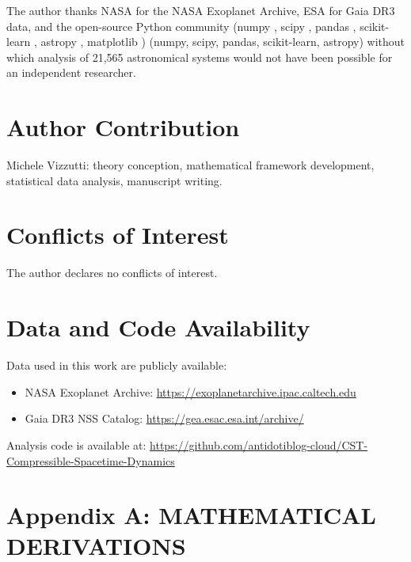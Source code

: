 \documentclass[11pt,a4paper]{article}
\begin{document}
The author thanks NASA for the NASA Exoplanet Archive, ESA for Gaia DR3
data, and the open-source Python community (numpy \cite{ScipyDevelopers2020}, scipy \cite{ScipyDevelopers2020}, pandas \cite{ref72}, scikit-learn \cite{Pedregosa2011}, astropy \cite{AstropyCollaboration2013,AstropyCollaboration2018}, matplotlib \cite{Hunter2007}) (numpy, scipy, pandas,
scikit-learn, astropy) without which analysis of 21,565 astronomical
systems would not have been possible for an independent researcher.

\hypertarget{author-contribution}{%
\section*{Author Contribution}\label{author-contribution}}

Michele Vizzutti: theory conception, mathematical framework development, statistical data analysis, manuscript writing.

\hypertarget{conflicts-of-interest}{%
\section*{Conflicts of Interest}\label{conflicts-of-interest}}

The author declares no conflicts of interest.

\hypertarget{data-and-code-availability}{%
\section*{Data and Code Availability}\label{data-and-code-availability}}

Data used in this work are publicly available:
\begin{itemize}
  \item NASA Exoplanet Archive: \url{https://exoplanetarchive.ipac.caltech.edu}
  \item Gaia DR3 NSS Catalog: \url{https://gea.esac.esa.int/archive/}
\end{itemize}

Analysis code is available at: \url{https://github.com/antidotiblog-cloud/CST-Compressible-Spacetime-Dynamics}

\hypertarget{appendix-a-mathematical-derivations}{%
\section*{Appendix A: MATHEMATICAL
DERIVATIONS}\label{appendix-a-mathematical-derivations}}
\end{document}
